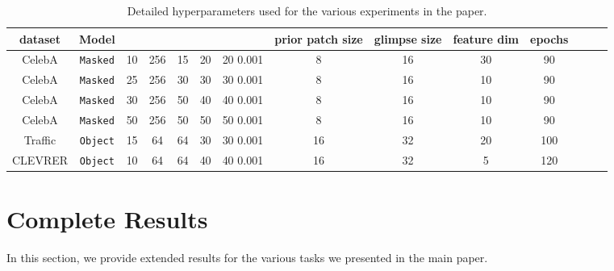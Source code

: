 \documentclass[nohyperref]{article}
\theoremstyle{plain}
\theoremstyle{definition}
\theoremstyle{remark}
\begin{document}
\begin{table}
\setlength{\tabcolsep}{4pt}
    \centering
    \begin{tabular}{cccccccccccccc}
    \toprule
    dataset                      & Model            &  &  &  &  &  & prior patch size & glimpse size  & feature dim  & epochs       \\ \midrule
    CelebA                      & \texttt{Masked}   & 10  &    256    &  15  &    20         &  20  0.001 &       8          &    16     &      30           & 90       \\
    CelebA                      & \texttt{Masked}   & 25  &    256     & 30    &     30      &  30  0.001 &        8          &    16  &        10           & 90    \\
    CelebA                      & \texttt{Masked}   & 30  &   256      &  50  &      40      &  40  0.001 &        8          &  16       &      10          & 90         \\
    CelebA                      & \texttt{Masked}   & 50  &    256     &  50  &       50      &  50  0.001 &        8          &   16   &        10          & 90         \\ \midrule
    Traffic                     & \texttt{Object}   & 15  &     64    &  64    &      30          & 30   0.001 &        16     &        32          &  20         &  100          \\
    CLEVRER                     & \texttt{Object}   & 10  &    64     &  64    &     40           & 40  0.001 &       16        &       32          &    5         & 120          \\ \bottomrule
    \end{tabular}
    \caption{Detailed hyperparameters used for the various experiments in the paper.}
    \label{tab_apndx:hyp}
\end{table}


\section{Complete Results}
\label{apndx:res}
In this section, we provide extended results for the various tasks we presented in the main paper.
\end{document}
